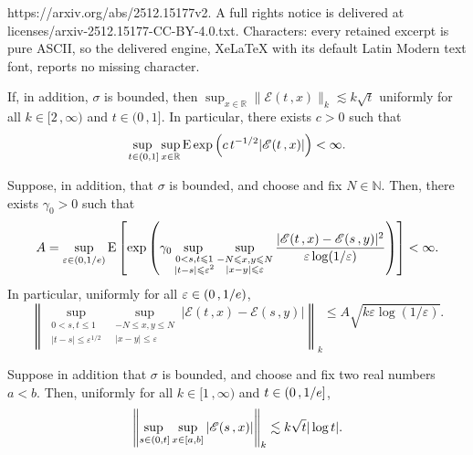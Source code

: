 \documentclass[10pt,a4paper]{amsart}
\newcommand{\E}{\mathrm{E}}
\newcommand{\N}{\mathbb{N}}
\newcommand{\R}{\mathbb{R}}
\newcommand{\e}{{\rm e}}
\renewcommand{\le}{\leqslant}
\begin{document}
https://arxiv.org/abs/2512.15177v2. A full rights notice is delivered at licenses/arxiv-2512.15177-CC-BY-4.0.txt. Characters: every retained excerpt is pure ASCII, so the delivered engine, XeLaTeX with its default Latin Modern text font, reports no missing character.
\begin{lemma}\label{lem:L_k:E}
	If, in addition, $\sigma$ is bounded, then
	$\sup_{x\in\R}\|\mathscr{E}(t\,,x)\|_k \lesssim k\sqrt{t}$
	uniformly for all $k \in [2\,,\infty)$ and $t \in (0\,,1]$.
	In particular, there exists $c>0$ such that
	\[
		\adjustlimits\sup_{t\in(0,1]}
		\sup_{x\in\R}\E\exp\left( c\, t^{-1/2}|\mathscr{E}(t\,,x)|\right)<\infty.
	\]
\end{lemma}

\begin{lemma}\label{lem:E:exp:E}
	Suppose, in addition, that $\sigma$ is bounded, and choose
	and fix $N\in\N$. Then, there exists $\gamma_0>0$ such that
	\begin{align*}
		A= \sup_{\varepsilon\in(0,1/\e)}\E\left[ \exp\left( \gamma_0 \adjustlimits
		\sup_{\substack{ 0<s, t \le 1\\|t-s| \le\varepsilon^2}}
		\sup_{\substack{ -N\le x, y\le N\\|x-y|\le\varepsilon}}
		\frac{|\mathscr{E}(t\,,x) - \mathscr{E}(s\,,y)|^2}{%
		\varepsilon\log(1/\varepsilon)}
		\right) \right] < \infty.
	\end{align*}
	In particular, uniformly for all $\varepsilon\in(0\,,1/\e)$,
	\[
		\left\| \sup_{\substack{ 0<s, t \le 1\\|t-s| \le\varepsilon^{1/2}}}
		\sup_{\substack{ -N\le x, y\le N\\|x-y|\le\varepsilon}}
		|\mathscr{E}(t\,,x) - \mathscr{E}(s\,,y)|\right\|_k
		\le A \sqrt{k\varepsilon\log(1/\varepsilon)}.
	\]
\end{lemma}

\begin{proposition}\label{pr:L_k:supE}
	Suppose in addition that $\sigma$ is bounded,
	and choose and fix two real numbers $a<b$. Then,
	uniformly for all $k \in [1\,,\infty)$ and $t \in (0\,,1/\e]$,
	\[
		\left\| \adjustlimits\sup_{s\in(0,t]}
		\sup_{x \in [a,b]} |\mathscr{E}(s\,,x)| \right\|_k \lesssim k \sqrt{t}|\log t|.
	\]
\end{proposition}
\end{document}
